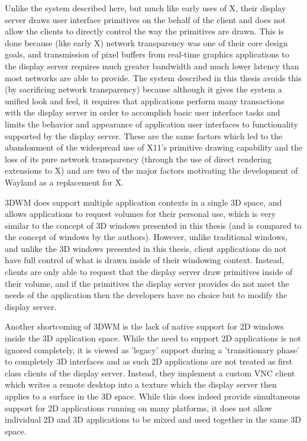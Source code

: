 Unlike the system described here, but much like early uses of X, their display server draws user interface primitives on the behalf of the client and does not allow the clients to directly control the way the primitives are drawn. This is done because (like early X) network transparency was one of their core design goals, and transmission of pixel buffers from real-time graphics applications to the display server requires much greater bandwidth and much lower latency than most networks are able to provide. The system described in this thesis avoids this (by sacrificing network transparency) because although it gives the system a unified look and feel, it requires that applications perform many transactions with the display server in order to accomplish basic user interface tasks and limits the behavior and appearance of application user interfaces to functionality supported by the display server. These are the same factors which led to the abandonment of the widespread use of X11's primitive drawing capability and the loss of its pure network transparency (through the use of direct rendering extensions to X) and are two of the major factors motivating the development of Wayland as a replacement for X. 

3DWM does support multiple application contexts in a single 3D space, and allows applications to request volumes for their personal use, which is very similar to the concept of 3D windows presented in this thesis (and is compared to the concept of windows by the authors). However, unlike traditional windows, and unlike the 3D windows presented in this thesis, client applications do not have full control of what is drawn inside of their windowing context. Instead, clients are only able to request that the display server draw primitives inside of their volume, and if the primitives the display server provides do not meet the needs of the application then the developers have no choice but to modify the display server.

Another shortcoming of 3DWM is the lack of native support for 2D windows inside the 3D application space. While the need to support 2D applications is not ignored completely, it is viewed as 'legacy' support during a 'transitionary phase' to completely 3D interfaces and as such 2D applications are not treated as first class clients of the display server. Instead, they implement a custom VNC client which writes a remote desktop into a texture which the display server then applies to a surface in the 3D space. While this does indeed provide simultaneous support for 2D applications running on many platforms, it does not allow individual 2D and 3D applications to be mixed and used together in the same 3D space. 
